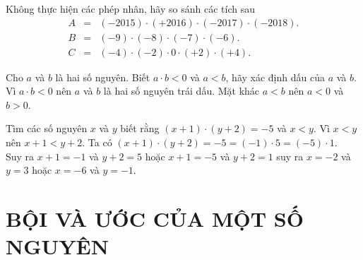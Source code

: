 \begin{bt}%
Không thực hiện các phép nhân, hãy so sánh các tích sau
\begin{eqnarray*}
A&=&(-2015) \cdot (+2016) \cdot (-2017) \cdot (-2018).\\
B&=&(-9) \cdot (-8) \cdot (-7) \cdot (-6).\\
C&=&(-4) \cdot (-2) \cdot 0 \cdot (+2) \cdot (+4).
\end{eqnarray*}
\end{bt}


\begin{bt}%
Cho $ a $ và $ b $ là hai số nguyên. Biết $ a \cdot b<0 $ và $ a<b $, hãy xác định dấu của $ a $ và $ b $.
	\loigiai
	{
Vì 	$ a \cdot b<0 $ nên $ a $ và $ b $ là hai số nguyên trái dấu. Mặt khác $ a<b $ nên $ a<0 $ và $ b>0 $.	
	}
\end{bt}


\begin{bt}%
Tìm các số nguyên $ x $ và $ y $ biết rằng $ (x+1) \cdot (y+2)=-5 $ và $ x<y $.	
	\loigiai
	{
Vì $ x<y $ nên $ x+1<y+2 $. Ta có $ (x+1) \cdot (y+2)=-5=(-1)\cdot 5 =(-5) \cdot 1 $.\\
Suy ra $ x+1=-1 $ và $ y+2=5 $ hoặc $ x+1=-5 $ và $ y+2=1 $ suy ra $ x=-2 $ và $ y=3 $ hoặc $ x=-6 $ và $ y=-1 $. 
	}
\end{bt}

\section{BỘI VÀ ƯỚC CỦA MỘT SỐ NGUYÊN}
